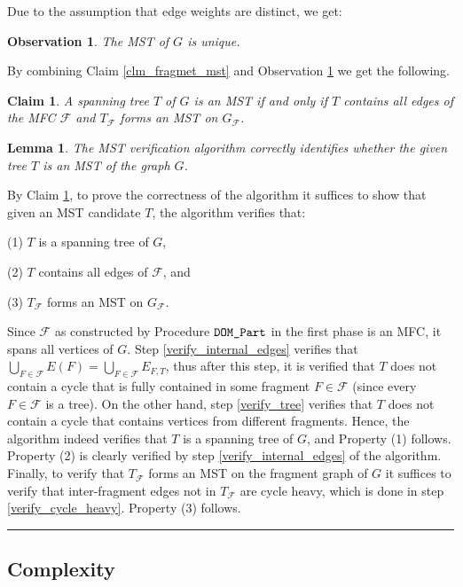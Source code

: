 \documentclass[11pt,letter]{article}
\def\DOM{\mbox{\tt DOM\_Part}}
\def\cF{\mathcal{F}}
\newtheorem{lemma}[theorem]{Lemma}
\newtheorem{observation}[theorem]{Observation}
\newtheorem{claim}[theorem]{Claim}
\newcommand{\qed}{\rule{7pt}{7pt}}
\newenvironment{proof}{\noindent{\bf Proof}\hspace*{1em}}{\qed\bigskip}
\begin{document}
Due to the assumption that edge weights are distinct, we get:
\begin{observation} 
\label{unique_mst}
The MST of $G$ is unique.
\end{observation}
By combining Claim \ref{clm_fragmet_mst} and Observation \ref{unique_mst} 
we get the following.
\begin{claim} \label{show_mst}
A spanning tree $T$ of $G$ is an MST if and only if  $T$ contains all edges 
of the MFC $\cF$ and $T_{\cF}$ forms an MST on $G_{\cF}$.
\end{claim}

\begin{lemma}
\label{lem:correct}
The MST verification algorithm correctly identifies whether the given tree $T$ 
is an MST of the graph $G$.
\end{lemma}

\begin{proof} 
By Claim \ref{show_mst}, to prove the correctness of the algorithm it suffices 
to show that given an MST candidate $T$, the algorithm  verifies that: 
\begin{description}
\item{(1)} $T$ is a spanning tree of $G$,
\item{(2)} $T$ contains all edges of $\cF$, and
\item{(3)} $T_{\cF}$ forms an MST on  $G_{\cF}$.
\end{description}

Since $\cF$ as constructed by Procedure $\DOM$ 
in the first phase is an MFC, it spans all vertices of $G$. 
Step \ref{verify_internal_edges} verifies that 
$\bigcup_{F\in \cF} E(F) = \bigcup_{F\in \cF} E_{F,T}$, 
thus after this step, it is verified that $T$ does not contain a cycle that 
is fully contained in some fragment $F\in \cF$ (since every $F\in \cF$ 
is a tree). On the other hand, step \ref{verify_tree} verifies that $T$ 
does not contain a cycle that contains vertices from different fragments. 
Hence, the algorithm indeed verifies that $T$ is a spanning tree of $G$, 
and Property (1) follows. 
Property (2) is clearly verified by step \ref{verify_internal_edges} of the algorithm.
Finally, to verify that $T_{\cF}$ forms an MST on the fragment graph 
of $G$ it suffices to verify that inter-fragment edges not in $T_{\cF}$ 
are cycle heavy, which is done in step \ref{verify_cycle_heavy}.
Property (3) follows.
\end{proof}

\subsection{Complexity}
\end{document}
